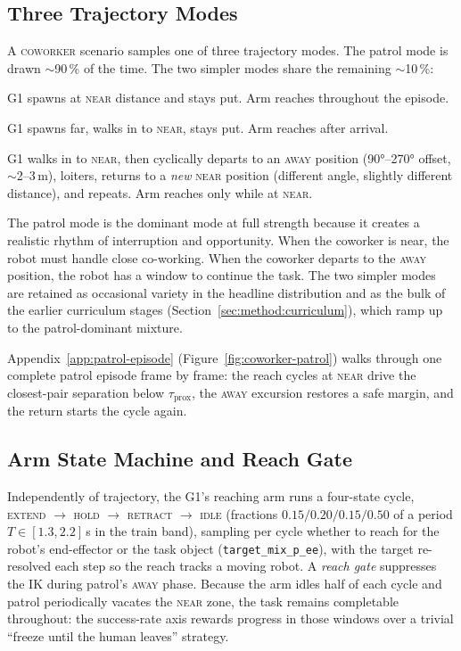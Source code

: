 \documentclass[11pt,a4paper]{report}
\newcommand{\coworker}{\textsc{coworker}}
\begin{document}
\subsection{Three Trajectory Modes}
\label{sec:bench:coworker:traj}

A \coworker{} scenario samples one of three trajectory modes. The
patrol mode is drawn $\sim$90\,\% of the time. The two simpler modes
share the remaining $\sim$10\,\%:

\begin{description}[leftmargin=2em,topsep=2pt,itemsep=2pt]
\item[\textsc{stationary}] G1 spawns at \textsc{near} distance and
  stays put. Arm reaches throughout the episode.
\item[\textsc{approach-loiter-depart}] G1 spawns far, walks in to
  \textsc{near}, stays put. Arm reaches after arrival.
\item[\textsc{coworker-patrol}] G1 walks in to \textsc{near}, then
  cyclically departs to an \textsc{away} position (90°--270°
  offset, $\sim$2--3\,m), loiters, returns to a \emph{new}
  \textsc{near} position (different angle, slightly different
  distance), and repeats. Arm reaches only while at \textsc{near}.
\end{description}

The patrol mode is the dominant mode at full strength because it
creates a realistic rhythm of interruption and opportunity. When the
coworker is near, the robot must handle close co-working. When the
coworker departs to the \textsc{away} position, the robot has a window
to continue the task. The two simpler modes are retained as occasional
variety in the headline distribution and as the bulk of the earlier
curriculum stages (Section~\ref{sec:method:curriculum}), which ramp up
to the patrol-dominant mixture.

Appendix~\ref{app:patrol-episode} (Figure~\ref{fig:coworker-patrol})
walks through one complete patrol episode frame by frame: the reach
cycles at \textsc{near} drive the closest-pair separation below
$\tau_{\mathrm{prox}}$, the \textsc{away} excursion restores a safe
margin, and the return starts the cycle again.

\subsection{Arm State Machine and Reach Gate}
\label{sec:bench:coworker:arm}

Independently of trajectory, the G1's reaching arm runs a four-state
cycle, \textsc{extend} $\to$ \textsc{hold} $\to$ \textsc{retract}
$\to$ \textsc{idle} (fractions $0.15/0.20/0.15/0.50$ of a period
$T \in [1.3, 2.2]$\,s in the train band), sampling per cycle whether
to reach for the robot's end-effector or the task object
(\texttt{target\_mix\_p\_ee}), with the target re-resolved each step
so the reach tracks a moving robot. A \emph{reach gate} suppresses
the IK during patrol's \textsc{away} phase. Because the arm idles
half of each cycle and patrol periodically vacates the \textsc{near}
zone, the task remains completable throughout: the success-rate axis
rewards progress in those windows over a trivial ``freeze until the
human leaves'' strategy.
\end{document}
